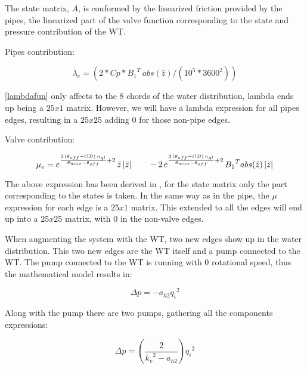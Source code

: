 The state matrix, $A$, is conformed by the linearized friction provided by the pipes, the linearized part of the valve function corresponding to the state and pressure contribution
of the WT.

Pipes contribution:

\begin{equation}
  {\lambda}_e = (2 * Cp * {B_1}^{T} \, abs(\hat{z}) /(10^5*3600^2))
  \label{lambdafun}
\end{equation}

\eqref{lambdafun} only affects to the 8 chords of the water distribution, lambda ends up being a $25x1$ matrix. However, we will have a lambda expression for all pipes
edges, resulting in a $25x25$ adding $0$ for those non-pipe edges. 

Valve contribution:

\vspace{4mm}
\begin{equation}
  {\mu}_e = e^{\frac{2 \, (\theta_{off} - \bar{OD}) \, n_{gl}}{\theta_{max}-\theta_{off}}+2} \, \bar{z} \, |\bar{z}| \quad \quad - \\
  2 \, e^{\frac{2 \, (\theta_{off} - \bar{OD}) \, n_{gl}}{\theta_{max}-\theta_{off}}+2} \, {B_1}^{T} abs(\hat{z}) \, |\bar{z}|
  \label{mufun}
\end{equation}

The above expression has been derived in , for the state matrix only the part corresponding to the states is taken. In the same way 
as in the pipe, the $\mu$ expression for each edge is a $25x1$ matrix. This extended to all the edges will end up into a $25x25$ matrix, with $0$ in the 
non-valve edges. 

When augmenting the system with the WT, two new edges show up in the water distribution. This two new edges are the WT itself and a pump connected to the WT.
The pump connected to the WT is running with $0$ rotational speed, thus the mathematical model results in:

\begin{equation}
    \Delta p = -a_{h2}{q_i}^2 
\end{equation}

Along with the pump there are two pumps, gathering all the components expressions:

\begin{equation}
      \Delta p = (\frac{2}{{k_v}^2-a_{h2}}){q_i}^2 
\end{equation} 

